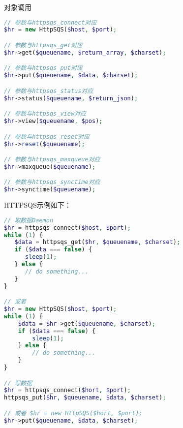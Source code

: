 对象调用


\begin{lstlisting}[language=PHP]
// 参数与httpsqs_connect对应 
$hr = new HttpSQS($host, $port);

// 参数与httpsqs_get对应 
$hr->get($queuename, $return_array, $charset);

// 参数与httpsqs_put对应 
$hr->put($queuename, $data, $charset);

// 参数与httpsqs_status对应 
$hr->status($queuename, $return_json);

// 参数与httpsqs_view对应 
$hr->view($queuename, $pos);

// 参数与httpsqs_reset对应 
$hr->reset($queuename);

// 参数与httpsqs_maxqueue对应 
$hr->maxqueue($queuename);

// 参数与httpsqs_synctime对应 
$hr->synctime($queuename);
\end{lstlisting}

HTTPSQS示例如下：


\begin{lstlisting}[language=PHP]
// 取数据Daemon 
$hr = httpsqs_connect($host, $port); 
while (1) { 
   $data = httpsqs_get($hr, $queuename, $charset); 
   if ($data === false) { 
      sleep(1); 
   } else { 
      // do something... 
   } 
}

// 或者 
$hr = new HttpSQS($host, $port); 
while (1) { 
    $data = $hr->get($queuename, $charset); 
    if ($data === false) { 
        sleep(1); 
    } else { 
        // do something... 
    } 
}

// 写数据 
$hr = httpsqs_connect($hort, $port); 
httpsqs_put($hr, $queuename, $data, $charset);

// 或者 $hr = new HttpSQS($hort, $port); 
$hr->put($queuename, $data, $charset); 
\end{lstlisting}




\begin{lstlisting}[language=bash]

\end{lstlisting}



\begin{lstlisting}[language=bash]

\end{lstlisting}




\begin{lstlisting}[language=bash]

\end{lstlisting}




